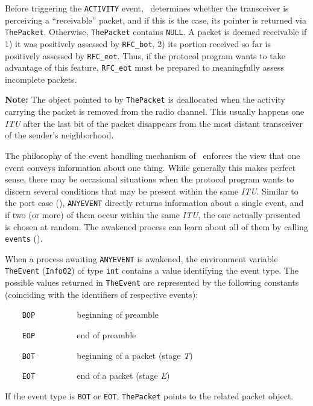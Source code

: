 Before triggering the {\tt ACTIVITY} event, \smurph\ determines whether
the transceiver is perceiving a ``receivable'' packet, and if this is the
case, its pointer is returned via {\tt ThePacket}.
Otherwise, {\tt ThePacket} contains {\tt NULL}.
A packet is deemed receivable if 1) it was positively assessed by
{\tt RFC\_bot}, 2) its portion received so far is positively assessed by
{\tt RFC\_eot}.
Thus, if the protocol program wants to take advantage of this
feature, {\tt RFC\_eot} must be prepared to meaningfully assess
incomplete packets.

\medskip

\noindent
{\bf Note:}
The object pointed to by {\tt ThePacket} is deallocated when the activity
carrying the packet is removed from the radio channel.
This usually happens one {\em ITU\/} after the last bit of the packet
disappears from the most distant transceiver of the sender's neighborhood.

\medskip

The philosophy of the event handling mechanism of \smurph\ enforces the
view that one event conveys information about one thing.
While generally this makes perfect sense, there may be occasional situations
when the protocol program wants to discern several conditions that may
be present within the same {\em ITU}.
Similar to the port case (), {\tt ANYEVENT} directly returns
information about a single event, and if
two (or more) of them occur within the same {\em ITU}, the one actually
presented is chosen at random.
The awakened process can learn about all of them
by calling {\tt events} ().

When a process awaiting {\tt ANYEVENT} is awakened, the environment
variable {\tt TheEvent} ({\tt Info02}) of type {\tt int}
contains a value identifying the event type.
The possible values returned in {\tt TheEvent} are represented by the
following constants (coinciding with the identifiers of respective events):

\bigskip

\noindent
{\tt ~~~~BOP~~~~~~~~~} beginning of preamble

\noindent
{\tt ~~~~EOP~~~~~~~~~} end of preamble

\noindent
{\tt ~~~~BOT~~~~~~~~~} beginning of a packet (stage {\em T\/})

\noindent
{\tt ~~~~EOT~~~~~~~~~} end of a packet (stage {\em E\/})

\bigskip

If the event type is {\tt BOT} or {\tt EOT},
{\tt ThePacket} points to the related packet object.

